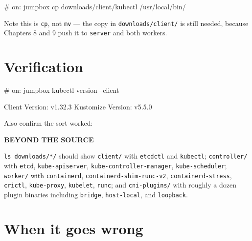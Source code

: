 \documentclass[11pt,oneside]{report}
\newcommand{\calloutlabel}[2]{{\sffamily\bfseries\footnotesize\color{#1}#2\quad}}
\begin{document}
\begin{cmdlst}
# on: jumpbox
{
  cp downloads/client/kubectl /usr/local/bin/
}
\end{cmdlst}

Note this is
\texttt{cp}, not
\texttt{mv} --- the
copy in
\texttt{downloads/}\allowbreak{}\texttt{client/}\allowbreak{}
is still needed,
because Chapters 8
and 9 push it to
\texttt{server} and
both workers.

\hypertarget{verification-1}{%
\section{Verification}\label{verification-1}}

\begin{cmdlst}
# on: jumpbox
kubectl version --client
\end{cmdlst}

\begin{outlst}
Client Version: v1.32.3
Kustomize Version: v5.5.0
\end{outlst}

Also confirm the
sort worked:

\begin{beyondbox}\calloutlabel{teal}{BEYOND THE SOURCE}

\texttt{ls\ downloads/*/}
should show
\texttt{client/}
with
\texttt{etcdctl} and
\texttt{kubectl};
\texttt{controller/}
with \texttt{etcd},
\texttt{kube-apiserver},
\texttt{kube-}\allowbreak{}\texttt{controller-}\allowbreak{}\texttt{manager},
\texttt{kube-scheduler};
\texttt{worker/}
with
\texttt{containerd},
\texttt{containerd-}\allowbreak{}\texttt{shim-}\allowbreak{}\texttt{runc-}\allowbreak{}\texttt{v2},
\texttt{containerd-}\allowbreak{}\texttt{stress},
\texttt{crictl},
\texttt{kube-proxy},
\texttt{kubelet},
\texttt{runc}; and
\texttt{cni-plugins/}
with roughly a dozen
plugin binaries
including
\texttt{bridge},
\texttt{host-local},
and
\texttt{loopback}.

\end{beyondbox}

\hypertarget{when-it-goes-wrong-1}{%
\section{When it
goes
wrong}\label{when-it-goes-wrong-1}}
\end{document}
